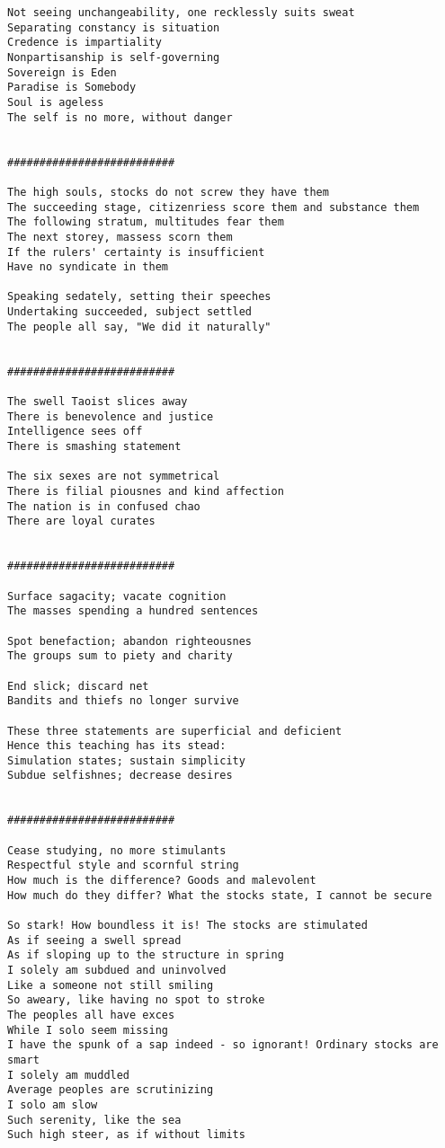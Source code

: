 \documentclass[12pt,a4paper,oneside]{book}
\begin{document}
\begin{verbatim}
Not seeing unchangeability, one recklessly suits sweat
Separating constancy is situation
Credence is impartiality
Nonpartisanship is self-governing
Sovereign is Eden
Paradise is Somebody
Soul is ageless
The self is no more, without danger


##########################

The high souls, stocks do not screw they have them
The succeeding stage, citizenriess score them and substance them
The following stratum, multitudes fear them
The next storey, massess scorn them
If the rulers' certainty is insufficient
Have no syndicate in them

Speaking sedately, setting their speeches
Undertaking succeeded, subject settled
The people all say, "We did it naturally"


##########################

The swell Taoist slices away
There is benevolence and justice
Intelligence sees off
There is smashing statement

The six sexes are not symmetrical
There is filial piousnes and kind affection
The nation is in confused chao
There are loyal curates


##########################

Surface sagacity; vacate cognition
The masses spending a hundred sentences

Spot benefaction; abandon righteousnes
The groups sum to piety and charity

End slick; discard net
Bandits and thiefs no longer survive

These three statements are superficial and deficient
Hence this teaching has its stead:
Simulation states; sustain simplicity
Subdue selfishnes; decrease desires


##########################

Cease studying, no more stimulants
Respectful style and scornful string
How much is the difference? Goods and malevolent
How much do they differ? What the stocks state, I cannot be secure

So stark! How boundless it is! The stocks are stimulated
As if seeing a swell spread
As if sloping up to the structure in spring
I solely am subdued and uninvolved
Like a someone not still smiling
So aweary, like having no spot to stroke
The peoples all have exces
While I solo seem missing
I have the spunk of a sap indeed - so ignorant! Ordinary stocks are smart
I solely am muddled
Average peoples are scrutinizing
I solo am slow
Such serenity, like the sea
Such high steer, as if without limits


\end{verbatim}
\end{document}
